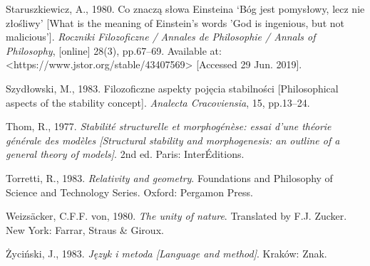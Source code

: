 \documentclass[a4paper]{article}
\begin{document}
Staruszkiewicz, A., 1980. Co znaczą słowa Einsteina ‘Bóg jest pomysłowy, lecz nie złośliwy’ [What is the meaning  of
Einstein’s words ’God is ingenious, but not malicious’]. \textit{Roczniki Filozoficzne / }\textit{Annales de
Philosophie / Annals of Philosophy}, [online] 28(3), pp.67–69. Available at:
{\textless}https://www.jstor.org/stable/43407569{\textgreater} [Accessed 29 Jun. 2019].

Szydłowski, M., 1983. Filozoficzne aspekty pojęcia stabilności [Philosophical aspects of the stability concept].
\textit{Analecta Cracoviensia}, 15, pp.13–24.

Thom, R., 1977. \textit{Stabilité structurelle et morphogénèse: essai d’une théorie générale des modèles [Structural
stability and morphogenesis: an outline of a general theory of models]}. 2nd ed. Paris: InterÉditions.

Torretti, R., 1983. \textit{Relativity and geometry}. Foundations and Philosophy of Science and Technology Series.
Oxford: Pergamon Press.

Weizsäcker, C.F.F. von, 1980. \textit{The unity of nature}. Translated by F.J. Zucker. New York: Farrar, Straus \&
Giroux.

Życiński, J., 1983. \textit{Język i metoda [Language and method]}. Kraków: Znak.
\end{document}
